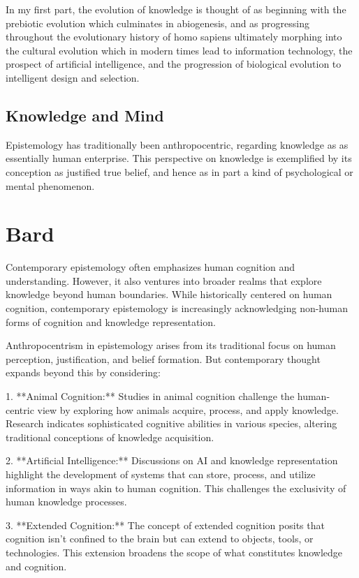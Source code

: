 \documentclass[10pt,titlepage]{book}
\begin{document}
In my first part, the evolution of knowledge is thought of as beginning with the prebiotic evolution which culminates in abiogenesis, and as progressing throughout the evolutionary history of homo sapiens ultimately morphing into the cultural evolution which in modern times lead to information technology, the prospect of artificial intelligence, and the progression of biological evolution to intelligent design and selection.

\subsection{Knowledge and Mind}

Epistemology has traditionally been anthropocentric, regarding knowledge as as essentially human enterprise.
This perspective on knowledge is exemplified by its conception as justified true belief, and hence as in part a kind of psychological or mental phenomenon.

\section{Bard}

Contemporary epistemology often emphasizes human cognition and understanding. However, it also ventures into broader realms that explore knowledge beyond human boundaries. While historically centered on human cognition, contemporary epistemology is increasingly acknowledging non-human forms of cognition and knowledge representation.

Anthropocentrism in epistemology arises from its traditional focus on human perception, justification, and belief formation. But contemporary thought expands beyond this by considering:

1. **Animal Cognition:** Studies in animal cognition challenge the human-centric view by exploring how animals acquire, process, and apply knowledge. Research indicates sophisticated cognitive abilities in various species, altering traditional conceptions of knowledge acquisition.

2. **Artificial Intelligence:** Discussions on AI and knowledge representation highlight the development of systems that can store, process, and utilize information in ways akin to human cognition. This challenges the exclusivity of human knowledge processes.

3. **Extended Cognition:** The concept of extended cognition posits that cognition isn't confined to the brain but can extend to objects, tools, or technologies. This extension broadens the scope of what constitutes knowledge and cognition.
\end{document}
